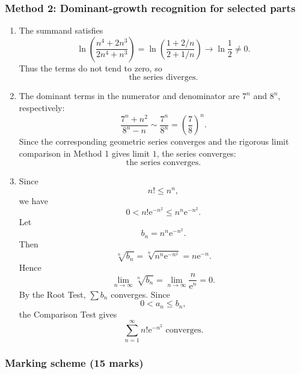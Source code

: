 \documentclass[12pt]{article}
\newcommand{\ee}{\mathrm{e}}
\begin{document}
\newpage
\subsubsection{Method 2: Dominant-growth recognition for selected parts}

\begin{enumerate}[label=(\alph*)]
\item The summand satisfies
\[
\ln\left(\frac{n^4+2n^3}{2n^4+n^3}\right)
=
\ln\left(\frac{1+2/n}{2+1/n}\right)
\longrightarrow
\ln\frac12\ne 0.
\]
Thus the terms do not tend to zero, so
\[
\boxed{\text{the series diverges}.}
\]

\item The dominant terms in the numerator and denominator are $7^n$ and $8^n$, respectively:
\[
\frac{7^n+n^2}{8^n-n}
\sim
\frac{7^n}{8^n}
=
\left(\frac78\right)^n.
\]
Since the corresponding geometric series converges and the rigorous limit comparison in Method 1 gives limit $1$, the series converges:
\[
\boxed{\text{the series converges}.}
\]

\item Since
\[
n!\le n^n,
\]
we have
\[
0<n!\ee^{-n^2}\le n^n\ee^{-n^2}.
\]
Let
\[
b_n=n^n\ee^{-n^2}.
\]
Then
\[
\sqrt[n]{b_n}
=
\sqrt[n]{n^n\ee^{-n^2}}
=
n\ee^{-n}.
\]
Hence
\[
\lim_{n\to\infty}\sqrt[n]{b_n}
=
\lim_{n\to\infty}\frac{n}{\ee^n}
=0.
\]
By the Root Test, $\sum b_n$ converges. Since
\[
0<a_n\le b_n,
\]
the Comparison Test gives
\[
\boxed{\sum_{n=1}^{\infty}n!\ee^{-n^2}\text{ converges}.}
\]
\end{enumerate}

\newpage
\subsubsection{Marking scheme (15 marks)}
\end{document}
